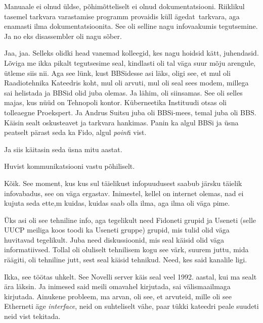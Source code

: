 Manuaale ei olnud üldse, põhimõtteliselt ei olnud dokumentatsiooni. Riiklikul tasemel tarkvara varastamise programm provaidis küll ägedat tarkvara, aga enamasti ilma dokumentatsioonita. See oli selline nagu  infovaakumis tegutsemine. Ja no eks disassembler oli nagu sõber.


Jaa, jaa. Selleks olidki head vanemad kolleegid, kes nagu hoidsid kätt, juhendasid. Lõviga me ikka pikalt tegutsesime seal, kindlasti oli tal väga suur mõju arengule, ütleme siis nii. Aga see lünk,  kust BBSidesse asi läks,  oligi see, et mul oli Raadiotehnika Kateedris koht, mul oli arvuti, mul oli seal sees modem, millega sai helistada ja BBSid olid juba olemas. Ja lähim, oli siinsamas. See oli selles majas, kus nüüd on Tehnopoli kontor. Küberneetika Instituudi otsas oli tolleaegne Proekspert. Ja Andrus Suitsu juba oli BBSi-mees, temal juba oli BBS. Käisin sealt oskusteavet ja tarkvara hankimas. Panin ka algul BBSi ja üsna peatselt pärast seda ka Fido, algul \emph{point}i vist.

Ja siis käitasin seda üsna mitu aastat. 


Huvist kommunikatsiooni vastu põhiliselt.


Kõik. See moment, kus kus sul täielikust infopuudusest saabub järsku täielik infovabadus, see on väga ergastav. Inimestel, kellel on internet olemas, nad ei kujuta seda ette,m kuidas, kuidas saab olla ilma, aga ilma oli väga pime.

Üks asi oli see tehniline info, aga tegelikult need Fidoneti grupid ja Useneti (selle UUCP meiliga koos toodi ka Useneti gruppe) grupid, mis tulid olid väga huvitavad tegelikult. Juba need diskussioonid, mis seal käisid olid  väga informatiivsed.  Tollal oli  oluliselt tehnilisem kogu see värk,  suurem juttu, mida räägiti, oli  tehniline jutt, sest seal käisid tehnikud. Need, kes said kanalile ligi.


Ikka, see töötas uhkelt. See Novelli server käis seal veel 1992. aastal, kui ma sealt ära läksin. Ja inimesed said meili omavahel kirjutada, sai välismaailmaga kirjutada. Ainukene probleem, ma arvan, oli see, et arvuteid, mille oli see Etherneti äge \emph{interface}, neid on suhteliselt vähe, paar tükki kateedri peale suudeti neid vist tekitada.

